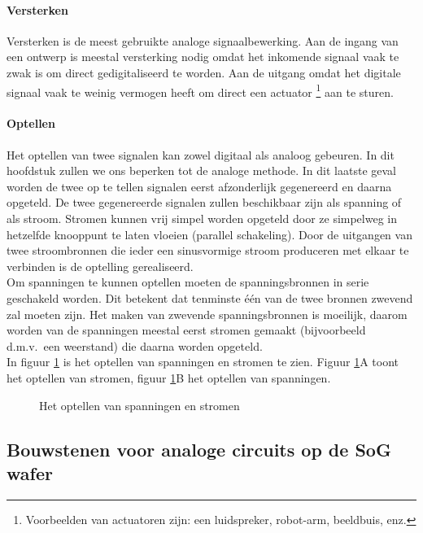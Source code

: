 \paragraph{Versterken}

Versterken is de meest gebruikte analoge signaalbewerking. Aan de ingang van een ontwerp is meestal versterking nodig omdat het inkomende signaal vaak te zwak is om direct gedi\-gitaliseerd te worden. Aan de uitgang omdat het digitale signaal vaak te weinig vermogen heeft om direct een actuator \footnote{ Voorbeelden van actuatoren zijn: een luidspreker, robot-arm, beeldbuis, enz.} aan te sturen.
\paragraph{Optellen}


Het optellen van twee signalen kan zowel digitaal als analoog gebeuren. In dit hoofdstuk zullen we ons beperken tot de analoge methode. In dit laatste geval worden de twee op te tellen signalen  eerst afzonderlijk gegenereerd en daarna opgeteld.
De twee gegenereerde signalen zullen beschikbaar zijn als spanning of als stroom.
Stromen kunnen vrij simpel worden opgeteld door ze simpelweg in hetzelfde knooppunt te laten vloeien (parallel schakeling).
Door de uitgangen van twee stroombronnen die ieder een sinusvormige stroom produceren met elkaar te verbinden is de optelling gerealiseerd.\\
Om spanningen te kunnen optellen moeten de spanningsbronnen in serie geschakeld worden.
Dit betekent dat tenminste \'e\'en van de twee bronnen zwevend zal moeten zijn.
Het maken van zwevende spanningsbronnen is moeilijk,
daarom worden van de spanningen meestal eerst stromen gemaakt
(bijvoorbeeld d.m.v.\ een weerstand) die daarna worden opgeteld.\\
In figuur \ref{OPTELLEN} is het optellen van spanningen en stromen te zien.
Figuur \ref{OPTELLEN}A toont het optellen van stromen,
figuur \ref{OPTELLEN}B het optellen van spanningen.



\begin{figure}[htb]
\centerline{}
\caption{Het optellen van spanningen en stromen}
\label{OPTELLEN}
\end{figure}



\subsection{Bouwstenen voor analoge circuits op de SoG wafer}


